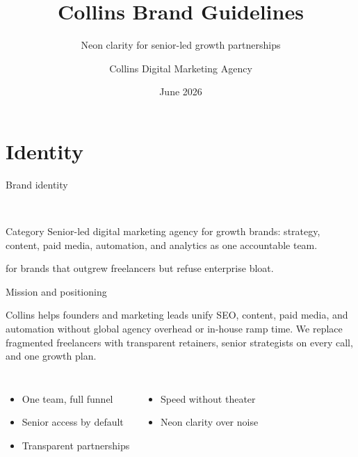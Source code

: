 \documentclass[aspectratio=169,10pt]{beamer}
\title{Collins Brand Guidelines}
\subtitle{Neon clarity for senior-led growth partnerships}
\author{Collins Digital Marketing Agency}
\date{June 2026}
\begin{document}
\begin{frame}[plain]
  \titlepage
\end{frame}

\section{Identity}

\begin{frame}{Brand identity}

  \vspace{0.8em}
  \\

  \vspace{1.2em}
  \begin{collinsblock}{Category}
    Senior-led digital marketing agency for growth brands: strategy, content, paid media, automation, and analytics as one accountable team.
  \end{collinsblock}

  \vspace{0.6em}
   for brands that outgrew freelancers but refuse enterprise bloat.
\end{frame}

\begin{frame}{Mission and positioning}

  Collins helps founders and marketing leads unify SEO, content, paid media, and automation without global agency overhead or in-house ramp time. We replace fragmented freelancers with transparent retainers, senior strategists on every call, and one growth plan.

  \vspace{0.8em}
  \begin{columns}[T,onlytextwidth]
    \begin{itemize}
      \item One team, full funnel
      \item Senior access by default
      \item Transparent partnerships
    \end{itemize}
    \begin{itemize}
      \item Speed without theater
      \item Neon clarity over noise
    \end{itemize}
  \end{columns}
\end{frame}
\end{document}

